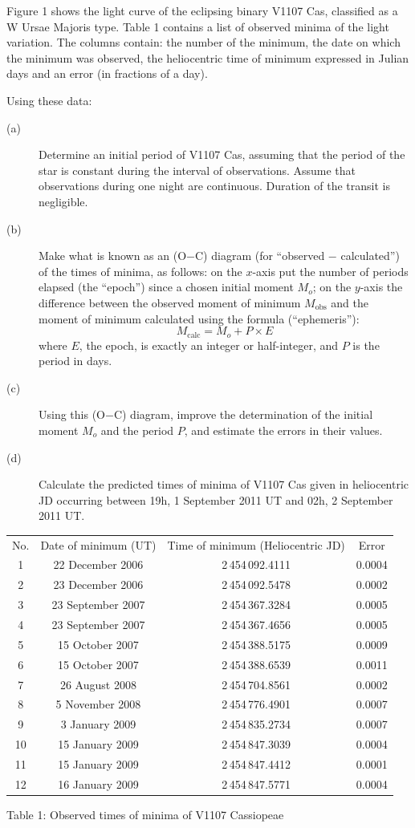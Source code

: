 Figure 1 shows the light curve of the eclipsing binary V1107 Cas, classified
as a W Ursae Majoris type. Table 1 contains a list of observed minima of the
light variation. The columns contain: the number of the minimum, the date on
which the minimum was observed, the heliocentric time of minimum expressed in
Julian days and an error (in fractions of a day).

Using these data:
\begin{description}
\item[(a)] Determine an initial period of V1107 Cas, assuming that the
  period of the star is constant during the interval of observations. Assume
  that observations during one night are continuous. Duration of the transit
  is negligible.
\item[(b)] Make what is known as an (O$-$C) diagram (for ``observed $-$
  calculated'') of the times of minima, as follows: on the $x$-axis put the
  number of periods elapsed (the ``epoch'') since a chosen initial moment
  $M_o$; on the $y$-axis the difference between the observed moment of
  minimum $M_{\mathrm{obs}}$ and the moment of minimum calculated using the
  formula (``ephemeris''):
  \[ M_{\mathrm{calc}} = M_o + P \times E \]
  where $E$, the epoch, is exactly an integer or half-integer, and $P$ is
  the period in days.
\item[(c)] Using this (O$-$C) diagram, improve the determination of the
  initial moment $M_o$ and the period $P$, and estimate the errors in their
  values.
\item[(d)] Calculate the predicted times of minima of V1107 Cas given in
  heliocentric JD occurring between 19h, 1 September 2011 UT and 02h,
  2 September 2011 UT.
\end{description}

\begin{center}
\begin{tabular}{cccc}
No. & Date of minimum (UT) & Time of minimum (Heliocentric JD) & Error \\
1 & 22 December 2006 & 2\,454\,092.4111 & 0.0004 \\
2 & 23 December 2006 & 2\,454\,092.5478 & 0.0002 \\
3 & 23 September 2007 & 2\,454\,367.3284 & 0.0005 \\
4 & 23 September 2007 & 2\,454\,367.4656 & 0.0005 \\
5 & 15 October 2007 & 2\,454\,388.5175 & 0.0009 \\
6 & 15 October 2007 & 2\,454\,388.6539 & 0.0011 \\
7 & 26 August 2008 & 2\,454\,704.8561 & 0.0002 \\
8 & 5 November 2008 & 2\,454\,776.4901 & 0.0007 \\
9 & 3 January 2009 & 2\,454\,835.2734 & 0.0007 \\
10 & 15 January 2009 & 2\,454\,847.3039 & 0.0004 \\
11 & 15 January 2009 & 2\,454\,847.4412 & 0.0001 \\
12 & 16 January 2009 & 2\,454\,847.5771 & 0.0004 \\
\end{tabular}

\medskip
Table 1: Observed times of minima of V1107 Cassiopeae
\end{center}
